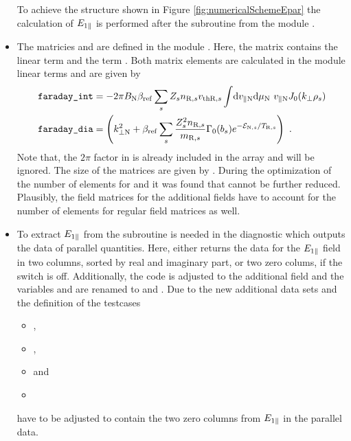 \begin{itemize}
    To achieve the structure shown in Figure \ref{fig:numericalSchemeEpar} the calculation of $E_{1\parallel}$ is performed after the subroutine  from the module .
    \item The matricies  and  are defined in the module . Here, the matrix  contains the linear term  and  the term . Both matrix elements are calculated in the module linear terms and are given by
    \begin{gather}
        \begin{aligned}
            \texttt{faraday\_int} &= - 2\pi B_\mathrm{N} \beta_\mathrm{ref} \sum_s Z_s n_{\mathrm{R},s} v_{\mathrm{th}\mathrm{R},s} \int \! \mathrm{d}v_{\parallel \mathrm{N}} \mathrm{d}\mu_\mathrm{N} ~ v_{\parallel \mathrm{N}} J_0(k_\perp \rho_s)\\
            \texttt{faraday\_dia} &= \left(k_{\perp \mathrm{N}}^2 + \beta_\mathrm{ref} \sum_s \frac{Z^2_sn_{\mathrm{R},s}}{m_{\mathrm{R},s}} \Gamma_0(b_s) e^{-\mathcal{E}_{\mathrm{N},s}/T_{\mathrm{R},s}} \right)~.
        \end{aligned}
    \end{gather}
    Note that, the $2\pi$ factor in  is already included in the array  \cite{GKWManual} and will be ignored. The size of the matrices are given by . During the optimization of the number of elements for  and  it was found that  cannot be further reduced. Plausibly, the field matrices for the additional fields have to account for the number of elements for regular field matrices as well.
    \item To extract $E_{1\parallel}$ from  the subroutine  is needed in the diagnostic  which outputs the data of parallel quantities. Here,  either returns the data for the $E_{1\parallel}$ field in two columns, sorted by real and imaginary part, or two zero colums, if the  switch is off. Additionally, the code is adjusted to the additional field and the variables  and  are renamed to  and . Due to the new additional data sets and the definition of  the testcases
    \begin{itemize}
        \item {},
        \item {},
        \item {} and
        \item {}
    \end{itemize}
    have to be adjusted to contain the two zero columns from $E_{1\parallel}$ in the parallel data.
\end{itemize}

